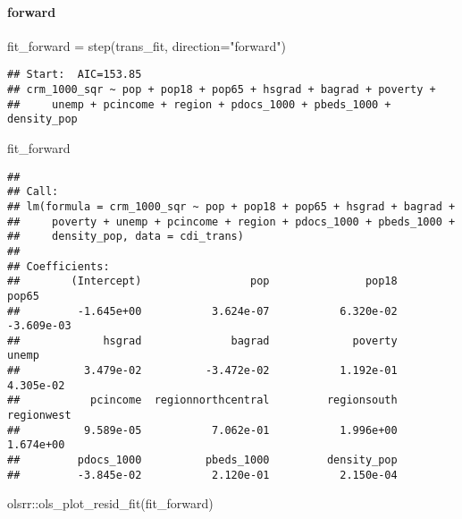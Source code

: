 \documentclass[
]{article}
\newenvironment{Shaded}{\begin{snugshade}}{\end{snugshade}}
\newcommand{\AttributeTok}[1]{\textcolor[rgb]{0.77,0.63,0.00}{#1}}
\newcommand{\FunctionTok}[1]{\textcolor[rgb]{0.00,0.00,0.00}{#1}}
\newcommand{\NormalTok}[1]{#1}
\newcommand{\OtherTok}[1]{\textcolor[rgb]{0.56,0.35,0.01}{#1}}
\newcommand{\SpecialCharTok}[1]{\textcolor[rgb]{0.00,0.00,0.00}{#1}}
\newcommand{\StringTok}[1]{\textcolor[rgb]{0.31,0.60,0.02}{#1}}
\begin{document}
\hypertarget{forward}{%
\paragraph{forward}\label{forward}}

\begin{Shaded}
\begin{Highlighting}[]
\NormalTok{fit\_forward }\OtherTok{=} \FunctionTok{step}\NormalTok{(trans\_fit, }\AttributeTok{direction=}\StringTok{"forward"}\NormalTok{)}
\end{Highlighting}
\end{Shaded}

\begin{verbatim}
## Start:  AIC=153.85
## crm_1000_sqr ~ pop + pop18 + pop65 + hsgrad + bagrad + poverty + 
##     unemp + pcincome + region + pdocs_1000 + pbeds_1000 + density_pop
\end{verbatim}

\begin{Shaded}
\begin{Highlighting}[]
\NormalTok{fit\_forward}
\end{Highlighting}
\end{Shaded}

\begin{verbatim}
## 
## Call:
## lm(formula = crm_1000_sqr ~ pop + pop18 + pop65 + hsgrad + bagrad + 
##     poverty + unemp + pcincome + region + pdocs_1000 + pbeds_1000 + 
##     density_pop, data = cdi_trans)
## 
## Coefficients:
##        (Intercept)                 pop               pop18               pop65  
##         -1.645e+00           3.624e-07           6.320e-02          -3.609e-03  
##             hsgrad              bagrad             poverty               unemp  
##          3.479e-02          -3.472e-02           1.192e-01           4.305e-02  
##           pcincome  regionnorthcentral         regionsouth          regionwest  
##          9.589e-05           7.062e-01           1.996e+00           1.674e+00  
##         pdocs_1000          pbeds_1000         density_pop  
##         -3.845e-02           2.120e-01           2.150e-04
\end{verbatim}

\begin{Shaded}
\begin{Highlighting}[]
\NormalTok{olsrr}\SpecialCharTok{::}\FunctionTok{ols\_plot\_resid\_fit}\NormalTok{(fit\_forward)}
\end{Highlighting}
\end{Shaded}
\end{document}
